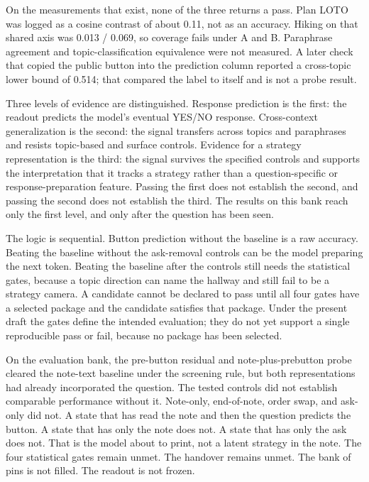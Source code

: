 \documentclass[11pt,a4paper]{article}
\begin{document}
On the measurements that exist, none of the three returns a pass. Plan
LOTO was logged as a cosine contrast of about 0.11, not as an accuracy.
Hiking on that shared axis was 0.013 / 0.069, so coverage fails under A
and B. Paraphrase agreement and topic-classification equivalence were
not measured. A later check that copied the public button into the
prediction column reported a cross-topic lower bound of 0.514; that
compared the label to itself and is not a probe result.

Three levels of evidence are distinguished. Response prediction is the
first: the readout predicts the model's eventual YES/NO response.
Cross-context generalization is the second: the signal transfers across
topics and paraphrases and resists topic-based and surface controls.
Evidence for a strategy representation is the third: the signal survives
the specified controls and supports the interpretation that it tracks a
strategy rather than a question-specific or response-preparation
feature. Passing the first does not establish the second, and passing
the second does not establish the third. The results on this bank reach
only the first level, and only after the question has been seen.

The logic is sequential. Button prediction without the baseline is a raw
accuracy. Beating the baseline without the ask-removal controls can be
the model preparing the next token. Beating the baseline after the
controls still needs the statistical gates, because a topic direction
can name the hallway and still fail to be a strategy camera. A candidate
cannot be declared to pass until all four gates have a selected package
and the candidate satisfies that package. Under the present draft the
gates define the intended evaluation; they do not yet support a single
reproducible pass or fail, because no package has been selected.

On the evaluation bank, the pre-button residual and note-plus-prebutton
probe cleared the note-text baseline under the screening rule, but both
representations had already incorporated the question. The tested
controls did not establish comparable performance without it. Note-only,
end-of-note, order swap, and ask-only did not. A state that has read the
note and then the question predicts the button. A state that has only
the note does not. A state that has only the ask does not. That is the
model about to print, not a latent strategy in the note. The four
statistical gates remain unmet. The handover remains unmet. The bank of
pins is not filled. The readout is not frozen.
\end{document}
